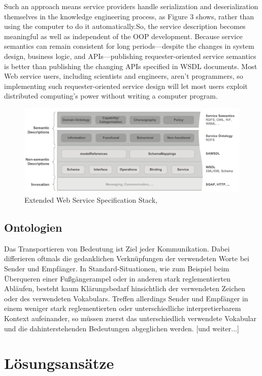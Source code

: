\documentclass[10pt,a4paper]{article}
\begin{document}
Such an approach means service providers handle serialization
and deserialization themselves in the knowledge
engineering process, as Figure 3 shows, rather than using
the computer to do it automatically.So, the service description
becomes meaningful as well as independent of the
OOP development.
Because service semantics can remain consistent for long
periods—despite the changes in system design, business
logic, and APIs—publishing requester-oriented service
semantics is better than publishing the changing APIs specified
in WSDL documents. Most Web service users, including
scientists and engineers, aren’t programmers, so
implementing such requester-oriented service design will
let most users exploit distributed computing’s power without
writing a computer program. \cite{shi1}

\begin{figure}
\includegraphics[width=14cm]{media/Extended-Web-Service-Specification-Stack.pdf}
\caption{Extended Web Service Specification Stack, \cite{WSMOLITE}}
\end{figure}

\subsection{Ontologien}

Das Transportieren von Bedeutung ist Ziel jeder Kommunikation. Dabei
differieren oftmals die gedanklichen Verknüpfungen der verwendeten Worte bei
Sender und Empfänger. In Standard-Situationen, wie zum Beispiel beim
Überqueren einer Fußgängerampel oder in anderen stark reglementierten
Abläufen, besteht kaum Klärungsbedarf hinsichtlich der verwendeten Zeichen
oder des verwendeten Vokabulars. Treffen allerdings Sender und Empfänger in
einem weniger stark reglementierten oder unterschiedliche interpretierbarem
Kontext aufeinander, so müssen zuerst das unterschiedlich verwendete Vokabular
und die dahinterstehenden Bedeutungen abgeglichen werden. [und weiter...] \cite{sgthesis}

\section{Lösungsansätze}
\label{l:loesungen}
\end{document}

